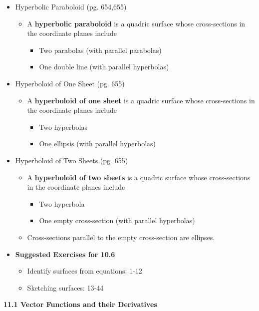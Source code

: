 \documentclass[12pt]{article}
\theoremstyle{plain}
\theoremstyle{definition}
\theoremstyle{remark}
\begin{document}
\begin{itemize}
\item Hyperbolic Paraboloid (pg. 654,655)
	\begin{itemize}
	\item A \textbf{hyperbolic paraboloid} is a quadric surface whose cross-sections in the coordinate planes include
		\begin{itemize}
		\item Two parabolas (with parallel parabolas)
		\item One double line (with parallel hyperbolas)
		\end{itemize}
	\end{itemize}
\item Hyperboloid of One Sheet (pg. 655)
	\begin{itemize}
	\item A \textbf{hyperboloid of one sheet} is a quadric surface whose cross-sections in the coordinate planes include
		\begin{itemize}
		\item Two hyperbolas
		\item One ellipsis (with parallel hyperbolas)
		\end{itemize}
	\end{itemize}
\newpage
\item Hyperboloid of Two Sheets (pg. 655)
	\begin{itemize}
	\item A \textbf{hyperboloid of two sheets} is a quadric surface whose cross-sections in the coordinate planes include
		\begin{itemize}
		\item Two hyperbola
		\item One empty cross-section (with parallel hyperbolas)
		\end{itemize}
	\item Cross-sections parallel to the empty cross-section are ellipses.
	\end{itemize}
\item \textbf{Suggested Exercises for 10.6}
	\begin{itemize}
	\item Identify surfaces from equations: 1-12
	\item Sketching surfaces: 13-44
	\end{itemize}
\end{itemize}

	\newpage
	
	\centerline{\bf 11.1 Vector Functions and their Derivatives}
	
\end{document}
